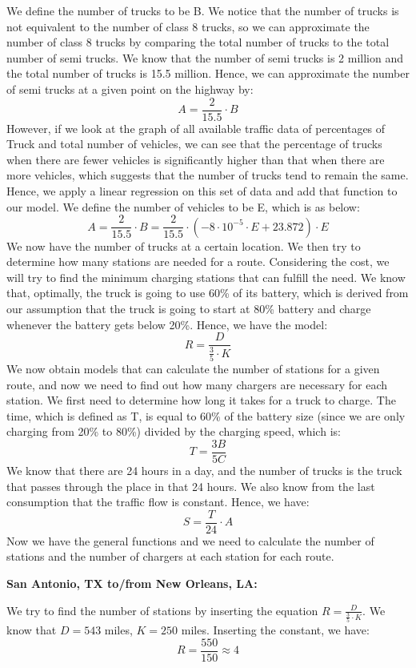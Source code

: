 We define the number of trucks to be B. We notice that the number of trucks is not equivalent to the number of class 8 trucks, so we can approximate the number of class 8 trucks by comparing the total number of trucks to the total number of semi trucks. We know that the number of semi trucks is 2 million and the total number of trucks is 15.5 million. Hence, we can approximate the number of semi trucks at a given point on the highway by: 
\[A = \frac{2}{15.5}\cdot B\]
\indent However, if we look at the graph of all available traffic data of percentages of Truck and total number of vehicles, we can see that the percentage of trucks when there are fewer vehicles is significantly higher than that when there are more vehicles, which suggests that the number of trucks tend to remain the same. Hence, we apply a linear regression on this set of data and add that function to our model. We define the number of vehicles to be E, which is as below:
\[A = \frac{2}{15.5}\cdot B = \frac{2}{15.5}\cdot(-8\cdot10^{-5}\cdot E+23.872)\cdot E\]
\indent We now have the number of trucks at a certain location. We then try to determine how many stations are needed for a route. Considering the cost, we will try to find the minimum charging stations that can fulfill the need. We know that, optimally, the truck is going to use 60\% of its battery, which is derived from our assumption that the truck is going to start at 80\% battery and charge whenever the battery gets below 20\%. Hence, we have the model: 
\[R = \frac{D}{\displaystyle \frac{3}{5}\cdot K}\]
\indent We now obtain models that can calculate the number of stations for a given route, and now we need to find out how many chargers are necessary for each station. We first need to determine how long it takes for a truck to charge. The time, which is defined as T, is equal to 60\% of the battery size (since we are only charging from 20\% to 80\%) divided by the charging speed, which is:
\[T = \frac{3B}{5C}\]
\indent We know that there are 24 hours in a day, and the number of trucks is the truck that passes through the place in that 24 hours. We also know from the last consumption that the traffic flow is constant. Hence, we have:
\[S = \frac{T}{24}\cdot A\]
\indent Now we have the general functions and we need to calculate the number of stations and the number of chargers at each station for each route. 

\noindent
\textbf{San Antonio, TX to/from New Orleans, LA:}

We try to find the number of stations by inserting the equation $\displaystyle R = \frac{D}{\frac{3}{5}\cdot K}$. We know that $D = 543$ miles, $K = 250$ miles. Inserting the constant, we have:
\[R = \frac{550}{150} \approx 4\]

